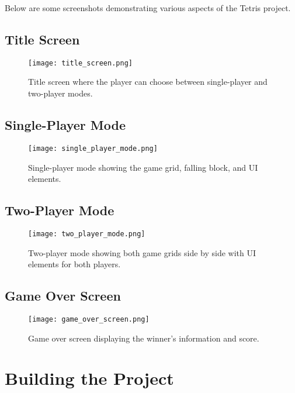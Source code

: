 \documentclass{article}
\begin{document}
Below are some screenshots demonstrating various aspects of the Tetris project.

\subsection{Title Screen}

\begin{figure}[H]
    \centering
    \texttt{[image: title\_screen.png]}
    \caption{Title screen where the player can choose between single-player and two-player modes.}
    \label{fig:title_screen}
\end{figure}

\subsection{Single-Player Mode}

\begin{figure}[H]
    \centering
    \texttt{[image: single\_player\_mode.png]}
    \caption{Single-player mode showing the game grid, falling block, and UI elements.}
    \label{fig:single_player_mode}
\end{figure}

\subsection{Two-Player Mode}

\begin{figure}[H]
    \centering
    \texttt{[image: two\_player\_mode.png]}
    \caption{Two-player mode showing both game grids side by side with UI elements for both players.}
    \label{fig:two_player_mode}
\end{figure}

\subsection{Game Over Screen}

\begin{figure}[H]
    \centering
    \texttt{[image: game\_over\_screen.png]}
    \caption{Game over screen displaying the winner's information and score.}
    \label{fig:game_over_screen}
\end{figure}
\section{Building the Project}
\end{document}
